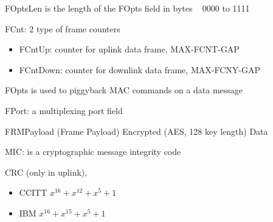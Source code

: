 \begin{multicols}{2}
\begin{itemize}
{{{{					\item FOptsLen  is the length of the FOpts field in bytes   0000 to 1111 

				}
				\item FCnt:  2 type of frame counters 
				\begin{itemize}
					\item FCntUp:  counter for uplink data frame, MAX-FCNT-GAP
					\item FCntDown:  counter for downlink data frame, MAX-FCNY-GAP
				\end{itemize}
				         
				\item FOpts  is used to piggyback MAC commands on a data message	
			}

			\item FPort:  a multiplexing port field

		    \item FRMPayload (Frame Payload)  Encrypted (AES, 128 key length) Data                                 
		}

		\item MIC:  is a cryptographic message integrity code
	}
	\item CRC  (only in uplink), 
	\begin{itemize}
		\item CCITT  $x^{16} + x^{12} + x^{5} + 1$
		\item IBM  $x^{16} + x^{15} + x^{5} + 1$
	\end{itemize}
\end{itemize}

\end{multicols}

